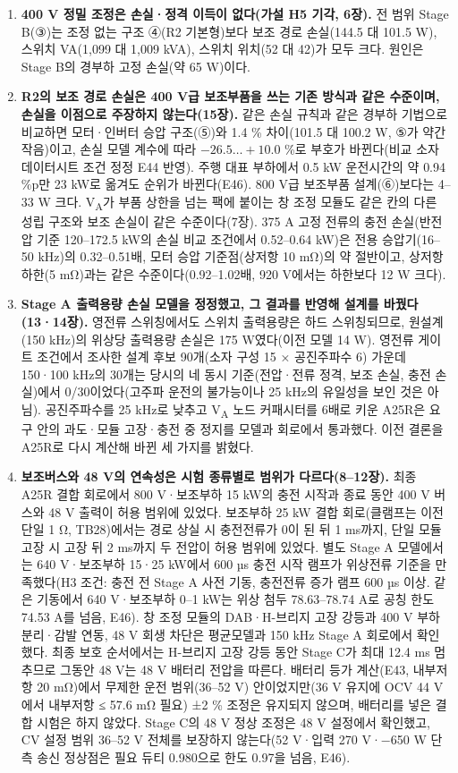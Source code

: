 \begin{enumerate}[label=\arabic*.]
\item \textbf{400 V 정밀 조정은 손실·정격 이득이 없다(가설 H5 기각, 6장).} 전 범위 Stage B(③)는 조정 없는 구조 ④(R2 기본형)보다 보조 경로 손실(144.5 대 101.5 W), 스위치 VA(1,099 대 1,009 kVA), 스위치 위치(52 대 42)가 모두 크다. 원인은 Stage B의 경부하 고정 손실(약 65 W)이다.
\item \textbf{R2의 보조 경로 손실은 400 V급 보조부품을 쓰는 기존 방식과 같은 수준이며, 손실을 이점으로 주장하지 않는다(15장).} 같은 손실 규칙과 같은 경부하 기법으로 비교하면 모터·인버터 승압 구조(⑤)와 1.4 \% 차이(101.5 대 100.2 W, ⑤가 약간 작음)이고, 손실 모델 계수에 따라 $-26.5 \ldots +10.0$ \%로 부호가 바뀐다(비교 소자 데이터시트 조건 정정 E44 반영). 주행 대표 부하에서 0.5 kW 운전시간의 약 0.94 \%p만 23 kW로 옮겨도 순위가 바뀐다(E46). 800 V급 보조부품 설계(⑥)보다는 4--33 W 크다. V\textsubscript{A}가 부품 상한을 넘는 팩에 붙이는 창 조정 모듈도 같은 칸의 다른 성립 구조와 보조 손실이 같은 수준이다(7장). 375 A 고정 전류의 충전 손실(반전압 기준 120--172.5 kW의 손실 비교 조건에서 0.52--0.64 kW)은 전용 승압기(16--50 kHz)의 0.32--0.51배, 모터 승압 기준점(상저항 10 mΩ)의 약 절반이고, 상저항 하한(5 mΩ)과는 같은 수준이다(0.92–1.02배, 920 V에서는 하한보다 12 W 크다).
\item \textbf{Stage A 출력용량 손실 모델을 정정했고, 그 결과를 반영해 설계를 바꿨다(13·14장).} 영전류 스위칭에서도 스위치 출력용량은 하드 스위칭되므로, 원설계(150 kHz)의 위상당 출력용량 손실은 175 W였다(이전 모델 14 W). 영전류 게이트 조건에서 조사한 설계 후보 90개(소자 구성 15 × 공진주파수 6) 가운데 150·100 kHz의 30개는 당시의 네 동시 기준(전압·전류 정격, 보조 손실, 충전 손실)에서 0/30이었다(고주파 운전의 불가능이나 25 kHz의 유일성을 보인 것은 아님). 공진주파수를 25 kHz로 낮추고 V\textsubscript{A} 노드 커패시터를 6배로 키운 A25R은 요구 안의 과도·모듈 고장·충전 중 정지를 모델과 회로에서 통과했다. 이전 결론을 A25R로 다시 계산해 바뀐 세 가지를 밝혔다.
\item \textbf{보조버스와 48 V의 연속성은 시험 종류별로 범위가 다르다(8--12장).} 최종 A25R 결합 회로에서 800 V·보조부하 15 kW의 충전 시작과 종료 동안 400 V 버스와 48 V 출력이 허용 범위에 있었다. 보조부하 25 kW 결합 회로(클램프는 이전 단일 1 Ω, TB28)에서는 경로 상실 시 충전전류가 0이 된 뒤 1 ms까지, 단일 모듈 고장 시 고장 뒤 2 ms까지 두 전압이 허용 범위에 있었다. 별도 Stage A 모델에서는 640 V·보조부하 15·25 kW에서 600 µs 충전 시작 램프가 위상전류 기준을 만족했다(H3 조건: 충전 전 Stage A 사전 기동, 충전전류 증가 램프 600 µs 이상. 같은 기동에서 640 V·보조부하 0–1 kW는 위상 첨두 78.63–78.74 A로 공칭 한도 74.53 A를 넘음, E46). 창 조정 모듈의 DAB·H-브리지 고장 강등과 400 V 부하 분리·감발 연동, 48 V 회생 차단은 평균모델과 150 kHz Stage A 회로에서 확인했다. 최종 보호 순서에서는 H-브리지 고장 강등 동안 Stage C가 최대 12.4 ms 멈추므로 그동안 48 V는 48 V 배터리 전압을 따른다. 배터리 등가 계산(E43, 내부저항 20 mΩ)에서 무제한 운전 범위(36–52 V) 안이었지만(36 V 유지에 OCV 44 V에서 내부저항 ≤ 57.6 mΩ 필요) ±2 \% 조정은 유지되지 않으며, 배터리를 넣은 결합 시험은 하지 않았다. Stage C의 48 V 정상 조정은 48 V 설정에서 확인했고, CV 설정 범위 36–52 V 전체를 보장하지 않는다(52 V·입력 270 V·−650 W 단측 송신 정상점은 필요 듀티 0.980으로 한도 0.97을 넘음, E46).

\end{enumerate}
